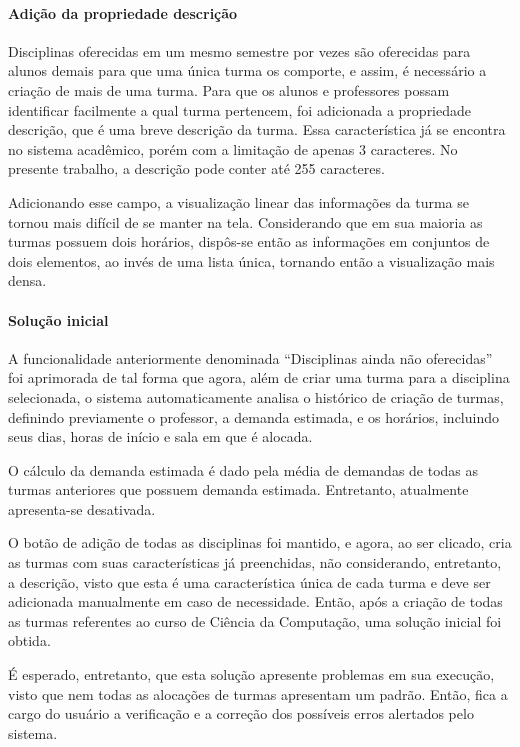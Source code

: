 \paragraph*{Adição da propriedade \textbf{descrição}}

Disciplinas oferecidas em um mesmo semestre por vezes são oferecidas para alunos demais para que uma única turma os comporte, e assim, é necessário a criação de mais de uma turma. Para que os alunos e professores possam identificar facilmente a qual turma pertencem, foi adicionada a propriedade descrição, que é uma breve descrição da turma. Essa característica já se encontra no sistema acadêmico, porém com a limitação de apenas 3 caracteres. No presente trabalho, a descrição pode conter até 255 caracteres.

Adicionando esse campo, a visualização linear das informações da turma se tornou mais difícil de se manter na tela. Considerando que em sua maioria as turmas possuem dois horários, dispôs-se então as informações em conjuntos de dois elementos, ao invés de uma lista única, tornando então a visualização mais densa.

\paragraph*{Solução inicial}

A funcionalidade anteriormente denominada ``Disciplinas ainda não oferecidas'' foi aprimorada de tal forma que agora, além de criar uma turma para a disciplina selecionada, o sistema automaticamente analisa o histórico de criação de turmas, definindo previamente o professor, a demanda estimada, e os horários, incluindo seus dias, horas de início e sala em que é alocada.

O cálculo da demanda estimada é dado pela média de demandas de todas as turmas anteriores que possuem demanda estimada. Entretanto, atualmente apresenta-se desativada.


O botão de adição de todas as disciplinas foi mantido, e agora, ao ser clicado, cria as turmas com suas características já preenchidas, não considerando, entretanto, a descrição, visto que esta é uma característica única de cada turma e deve ser adicionada manualmente em caso de necessidade. Então, após a criação de todas as turmas referentes ao curso de Ciência da Computação, uma solução inicial foi obtida.

É esperado, entretanto, que esta solução apresente problemas em sua execução, visto que nem todas as alocações de turmas apresentam um padrão. Então, fica a cargo do usuário a verificação e a correção dos possíveis erros alertados pelo sistema.

